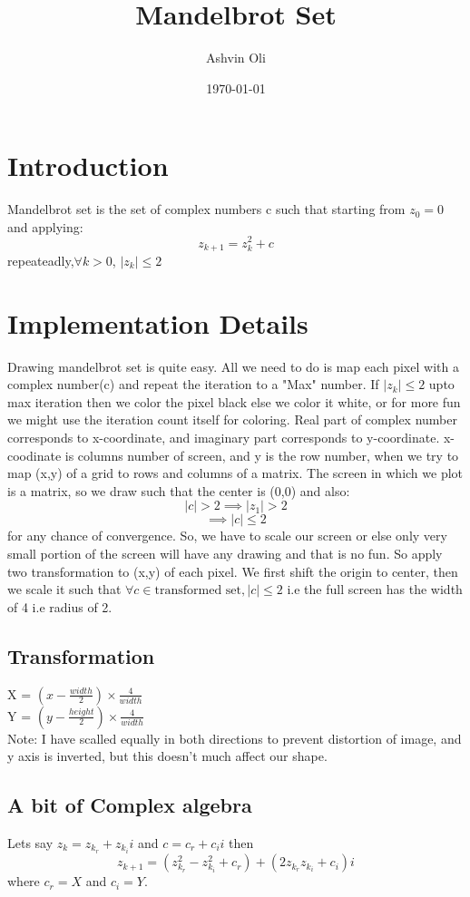 \documentclass[a4paper,11pt]{article}
\author{Ashvin Oli}
\date{\today}
\title{Mandelbrot Set}
\begin{document}
\maketitle
\tableofcontents

\newpage
\section{Introduction}
\label{sec:org9f92add}
Mandelbrot set is the set of complex numbers c such that starting from \(z_0 = 0\) and applying:
\[z_{k+1} = z_k^2+c\]
repeateadly,\(\forall k>0\), \(|z_k| \le 2\)  

\section{Implementation Details}
\label{sec:orgb409bd2}
Drawing mandelbrot set is quite easy. All we need to do is map each pixel with a complex number(c) and 
repeat the iteration to a "Max" number. If \(|z_k|\le 2\) upto max iteration then we color the pixel black
else we color it white, or for more fun we might use the iteration count itself for coloring.
Real part of complex number corresponds to x-coordinate, and imaginary part corresponds to y-coordinate.
x-coodinate is columns number of screen, and y is the row number, when we try to map (x,y) of a grid to 
rows and columns of a matrix. The screen in which we plot is a matrix, so we draw such that the center is (0,0) and 
also:
\[|c| > 2 \implies |z_1| > 2\]
\[\implies |c|\le 2\]
 for any chance of convergence.
So, we have to scale our screen or else only very small portion of the screen will have any drawing and that is
no fun. So apply two transformation to (x,y) of each pixel. We first shift the origin to center, then we scale it
such that \(\forall c \in \text{transformed set}, |c| \le 2\) i.e the full screen has the width of 4 i.e radius of 2.
\subsection{Transformation}
\label{sec:org7ddc6fb}
X = \((x-\frac{width}{2})\times \frac{4}{width}\)\\
Y =  \((y-\frac{height}{2})\times \frac{4}{width}\)\\
Note: I have scalled equally in both directions to prevent distortion of image, and y axis is inverted, but this 
doesn't much affect our shape.
\subsection{A bit of Complex algebra}
\label{sec:org5388e67}
Lets say \(z_k = z_{k_r}+z_{k_i}i\) and \(c = c_r+c_ii\) then
\[z_{k+1} = (z_{k_r}^2-z_{k_i}^2+c_r)+(2z_{k_r}z_{k_i}+c_i)i\]
where \(c_r = X\) and \(c_i = Y\).
\end{document}
